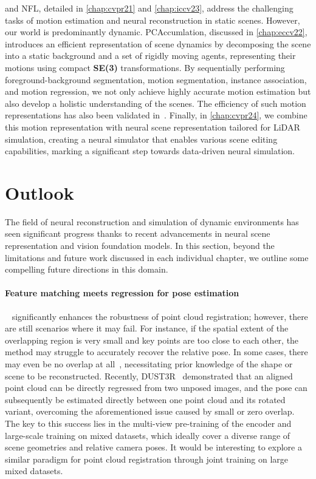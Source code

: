 \acro and NFL, detailed in \cref{chap:cvpr21} and \cref{chap:iccv23},  address the challenging tasks of motion estimation and neural reconstruction in static scenes. However, our world is predominantly dynamic. PCAccumlation, discussed in \cref{chap:eccv22}, introduces an efficient representation of scene dynamics by decomposing the scene into a static background and a set of rigidly moving agents, representing their motions using compact \textbf{SE(3)} transformations. By sequentially performing foreground-background segmentation, motion segmentation, instance association, and motion regression, we not only achieve highly accurate motion estimation but also develop a holistic understanding of the scenes. The efficiency of such motion representations has also been validated in~\cite{seidenschwarz2024semoli,vidanapathirana2024multi}. Finally, in \cref{chap:cvpr24}, we combine this motion representation with neural scene representation tailored for LiDAR simulation, creating a neural simulator that enables various scene editing capabilities, marking a significant step towards data-driven neural simulation.

\section{Outlook}
The field of neural reconstruction and simulation of dynamic environments has seen significant progress thanks to recent advancements in neural scene representation and vision foundation models. In this section, beyond the limitations and future work discussed in each individual chapter, we outline some compelling future directions in this domain.


\paragraph{Feature matching meets regression for pose estimation}
\acro~\cite{huang2021predator} significantly enhances the robustness of point cloud registration; however, there are still scenarios where it may fail. For instance, if the spatial extent of the overlapping region is very small and key points are too close to each other, the method may struggle to accurately recover the relative pose. In some cases, there may even be no overlap at all~\cite{xu2023point}, necessitating prior knowledge of the shape or scene to be reconstructed. Recently, DUST3R~\cite{wang2024dust3r,leroy2024grounding} demonstrated that an aligned point cloud can be directly regressed from two unposed images, and the pose can subsequently be estimated directly between one point cloud and its rotated variant, overcoming the aforementioned issue caused by small or zero overlap. The key to this success lies in the multi-view pre-training of the encoder and large-scale training on mixed datasets, which ideally cover a diverse range of scene geometries and relative camera poses. It would be interesting to explore a similar paradigm for point cloud registration through joint training on large mixed datasets.


